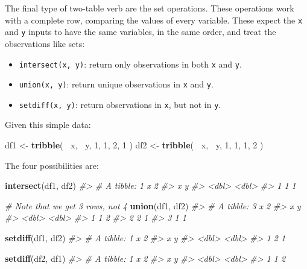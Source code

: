 \documentclass[]{book}
\newenvironment{Shaded}{\begin{snugshade}}{\end{snugshade}}
\newcommand{\CommentTok}[1]{\textcolor[rgb]{0.56,0.35,0.01}{\textit{#1}}}
\newcommand{\DecValTok}[1]{\textcolor[rgb]{0.00,0.00,0.81}{#1}}
\newcommand{\KeywordTok}[1]{\textcolor[rgb]{0.13,0.29,0.53}{\textbf{#1}}}
\newcommand{\NormalTok}[1]{#1}
\newcommand{\OperatorTok}[1]{\textcolor[rgb]{0.81,0.36,0.00}{\textbf{#1}}}
\newcommand{\StringTok}[1]{\textcolor[rgb]{0.31,0.60,0.02}{#1}}
\providecommand{\tightlist}{%
  \setlength{\itemsep}{0pt}\setlength{\parskip}{0pt}}
\theoremstyle{definition}
\theoremstyle{definition}
\theoremstyle{definition}
\theoremstyle{remark}
\begin{document}
The final type of two-table verb are the set operations. These
operations work with a complete row, comparing the values of every
variable. These expect the \texttt{x} and \texttt{y} inputs to have the
same variables, in the same order, and treat the observations like sets:

\begin{itemize}
\tightlist
\item
  \texttt{intersect(x,\ y)}: return only observations in both \texttt{x}
  and \texttt{y}.
\item
  \texttt{union(x,\ y)}: return unique observations in \texttt{x} and
  \texttt{y}.
\item
  \texttt{setdiff(x,\ y)}: return observations in \texttt{x}, but not in
  \texttt{y}.
\end{itemize}

Given this simple data:

\begin{Shaded}
\begin{Highlighting}[]
\NormalTok{df1 <-}\StringTok{ }\KeywordTok{tribble}\NormalTok{(}
  \OperatorTok{~}\NormalTok{x, }\OperatorTok{~}\NormalTok{y,}
   \DecValTok{1}\NormalTok{,  }\DecValTok{1}\NormalTok{,}
   \DecValTok{2}\NormalTok{,  }\DecValTok{1}
\NormalTok{)}
\NormalTok{df2 <-}\StringTok{ }\KeywordTok{tribble}\NormalTok{(}
  \OperatorTok{~}\NormalTok{x, }\OperatorTok{~}\NormalTok{y,}
   \DecValTok{1}\NormalTok{,  }\DecValTok{1}\NormalTok{,}
   \DecValTok{1}\NormalTok{,  }\DecValTok{2}
\NormalTok{)}
\end{Highlighting}
\end{Shaded}

The four possibilities are:

\begin{Shaded}
\begin{Highlighting}[]
\KeywordTok{intersect}\NormalTok{(df1, df2)}
\CommentTok{#> # A tibble: 1 x 2}
\CommentTok{#>       x     y}
\CommentTok{#>   <dbl> <dbl>}
\CommentTok{#> 1     1     1}

\CommentTok{# Note that we get 3 rows, not 4}
\KeywordTok{union}\NormalTok{(df1, df2)}
\CommentTok{#> # A tibble: 3 x 2}
\CommentTok{#>       x     y}
\CommentTok{#>   <dbl> <dbl>}
\CommentTok{#> 1     1     2}
\CommentTok{#> 2     2     1}
\CommentTok{#> 3     1     1}

\KeywordTok{setdiff}\NormalTok{(df1, df2)}
\CommentTok{#> # A tibble: 1 x 2}
\CommentTok{#>       x     y}
\CommentTok{#>   <dbl> <dbl>}
\CommentTok{#> 1     2     1}

\KeywordTok{setdiff}\NormalTok{(df2, df1)}
\CommentTok{#> # A tibble: 1 x 2}
\CommentTok{#>       x     y}
\CommentTok{#>   <dbl> <dbl>}
\CommentTok{#> 1     1     2}
\end{Highlighting}
\end{Shaded}
\end{document}
